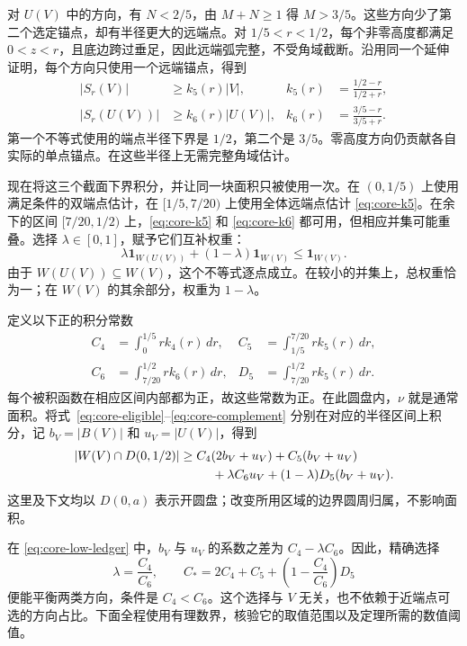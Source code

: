 对 $U(V)$ 中的方向，有 $N<2/5$，由 $M+N\geq1$ 得 $M>3/5$。这些方向少了第二个选定锚点，却有半径更大的远端点。对 $1/5<r<1/2$，每个非零高度都满足 $0<z<r$，且底边跨过垂足，因此远端弧完整，不受角域截断。沿用同一个延伸证明，每个方向只使用一个远端锚点，得到
\begin{align}
 |S_r(V)|&\geq k_5(r)|V|,
 &k_5(r)&=\frac{1/2-r}{1/2+r},\label{eq:core-k5}\\
 |S_r(U(V))|&\geq k_6(r)|U(V)|,
 &k_6(r)&=\frac{3/5-r}{3/5+r}.\label{eq:core-k6}
\end{align}
第一个不等式使用的端点半径下界是 $1/2$，第二个是 $3/5$。零高度方向仍贡献各自实际的单点锚点。在这些半径上无需完整角域估计。

现在将这三个截面下界积分，并让同一块面积只被使用一次。在 $(0,1/5)$ 上使用满足条件的双端点估计，在 $[1/5,7/20)$ 上使用全体远端点估计 \eqref{eq:core-k5}。在余下的区间 $[7/20,1/2)$ 上，\eqref{eq:core-k5} 和 \eqref{eq:core-k6} 都可用，但相应并集可能重叠。选择 $\lambda\in[0,1]$，赋予它们互补权重：
\begin{equation}
 \lambda\mathbf1_{W(U(V))}+(1-\lambda)\mathbf1_{W(V)}
                            \leq\mathbf1_{W(V)}.
\label{eq:core-complement}
\end{equation}
由于 $W(U(V))\subseteq W(V)$，这个不等式逐点成立。在较小的并集上，总权重恰为一；在 $W(V)$ 的其余部分，权重为 $1-\lambda$。

定义以下正的积分常数
\begin{align}
 C_4&=\int_0^{1/5}r k_4(r)\,dr,&
 C_5&=\int_{1/5}^{7/20}r k_5(r)\,dr,\nonumber\\
 C_6&=\int_{7/20}^{1/2}r k_6(r)\,dr,&
 D_5&=\int_{7/20}^{1/2}r k_5(r)\,dr.
\label{eq:core-four-integrals}
\end{align}
每个被积函数在相应区间内部都为正，故这些常数为正。在此圆盘内，$\nu$ 就是通常面积。将式~\eqref{eq:core-eligible}--\eqref{eq:core-complement} 分别在对应的半径区间上积分，记 $b_V=|B(V)|$ 和 $u_V=|U(V)|$，得到
\begin{align}
 |W(V)\cap D(0,1/2)|
 &\geq C_4(2b_V+u_V)+C_5(b_V+u_V)\nonumber\\
 &\hspace{9mm}+\lambda C_6u_V+(1-\lambda)D_5(b_V+u_V).
\label{eq:core-low-ledger}
\end{align}
这里及下文均以 $D(0,a)$ 表示开圆盘；改变所用区域的边界圆周归属，不影响面积。

在 \eqref{eq:core-low-ledger} 中，$b_V$ 与 $u_V$ 的系数之差为 $C_4-\lambda C_6$。因此，精确选择
\begin{equation}
 \lambda=\frac{C_4}{C_6},\qquad
 C_* =2C_4+C_5+\left(1-\frac{C_4}{C_6}\right)D_5
\label{eq:core-price}
\end{equation}
便能平衡两类方向，条件是 $C_4<C_6$。这个选择与 $V$ 无关，也不依赖于近端点可选的方向占比。下面全程使用有理数界，核验它的取值范围以及定理所需的数值阈值。

